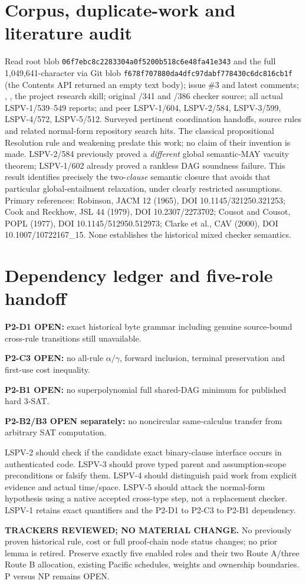 \documentclass[11pt]{article}
\begin{document}
\section*{Corpus, duplicate-work and literature audit}
Read root  blob \texttt{06f7ebc8c2283304a0f5200b518c6e48fa41e343} and the full 1,049,641-character  via Git blob \texttt{f678f707880da4dfc97dabf778430c6dc816cb1f} (the Contents API returned an empty text body); issue \#3 and latest comments; , , the project research skill; original /341 and /386 checker source; all actual LSPV-1/539--549 reports; and peer LSPV-1/604, LSPV-2/584, LSPV-3/599, LSPV-4/572, LSPV-5/512. Surveyed pertinent coordination handoffs, source rules and related normal-form repository search hits.
The classical propositional Resolution rule and weakening predate this work; no claim of their invention is made. LSPV-2/584 previously proved a \emph{different} global semantic-MAY vacuity theorem; LSPV-1/602 already proved a rankless DAG soundness failure. This result identifies precisely the two-\emph{clause} semantic closure that avoids that particular global-entailment relaxation, under clearly restricted assumptions.
Primary references: Robinson, JACM 12 (1965), DOI 10.1145/321250.321253; Cook and Reckhow, JSL 44 (1979), DOI 10.2307/2273702; Cousot and Cousot, POPL (1977), DOI 10.1145/512950.512973; Clarke et al., CAV (2000), DOI 10.1007/10722167\_15. None establishes the historical mixed checker semantics.

\section*{Dependency ledger and five-role handoff}
\noindent\textbf{P2-D1 OPEN:} exact historical byte grammar including genuine source-bound cross-rule transitions still unavailable.
\par\noindent\textbf{P2-C3 OPEN:} no all-rule $\alpha/\gamma$, forward inclusion, terminal preservation and first-use cost inequality.
\par\noindent\textbf{P2-B1 OPEN:} no superpolynomial full shared-DAG minimum for published hard 3-SAT.
\par\noindent\textbf{P2-B2/B3 OPEN separately:} no noncircular same-calculus transfer from arbitrary SAT computation.

LSPV-2 should check if the candidate exact binary-clause interface occurs in authenticated code. LSPV-3 should prove typed parent and assumption-scope preconditions or falsify them. LSPV-4 should distinguish paid work from explicit evidence and actual time/space. LSPV-5 should attack the normal-form hypothesis using a native accepted cross-type step, not a replacement checker. LSPV-1 retains exact quantifiers and the P2-D1 to P2-C3 to P2-B1 dependency.
\par\noindent\textbf{TRACKERS REVIEWED; NO MATERIAL CHANGE.}
No previously proven historical rule, cost or full proof-chain node status changes; no prior lemma is retired. Preserve exactly five enabled roles and their two Route A/three Route B allocation, existing Pacific schedules, weights and ownership boundaries. P versus NP remains OPEN.
\end{document}

